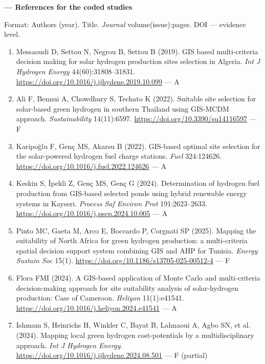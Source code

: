 \documentclass[11pt,a4paper]{article}
\begin{document}
\textbf{--- References for the coded studies}

Format: Authors (year). Title. \textit{Journal} volume(issue):pages. DOI --- evidence level.

\begin{enumerate}\setlength\itemsep{1pt}

  \item Messaoudi D, Settou N, Negrou B, Settou B (2019). GIS based multi-criteria decision making for solar hydrogen production sites selection in Algeria. \textit{Int J Hydrogen Energy} 44(60):31808--31831. \url{https://doi.org/10.1016/j.ijhydene.2019.10.099} --- A

  \item Ali F, Bennui A, Chowdhury S, Techato K (2022). Suitable site selection for solar-based green hydrogen in southern Thailand using GIS-MCDM approach. \textit{Sustainability} 14(11):6597. \url{https://doi.org/10.3390/su14116597} --- F

  \item Karipoğlu F, Genç MS, Akarsu B (2022). GIS-based optimal site selection for the solar-powered hydrogen fuel charge stations. \textit{Fuel} 324:124626. \url{https://doi.org/10.1016/j.fuel.2022.124626} --- A

  \item Keskin S, İpekli Z, Genç MS, Genç G (2024). Determination of hydrogen fuel production from GIS-based selected ponds using hybrid renewable energy systems in Kayseri. \textit{Process Saf Environ Prot} 191:2623--2633. \url{https://doi.org/10.1016/j.psep.2024.10.005} --- A

  \item Pinto MC, Gaeta M, Arco E, Boccardo P, Corgnati SP (2025). Mapping the suitability of North Africa for green hydrogen production: a multi-criteria spatial decision support system combining GIS and AHP for Tunisia. \textit{Energy Sustain Soc} 15(1). \url{https://doi.org/10.1186/s13705-025-00512-4} --- F

  \item Flora FMI (2024). A GIS-based application of Monte Carlo and multi-criteria decision-making approach for site suitability analysis of solar-hydrogen production: Case of Cameroon. \textit{Heliyon} 11(1):e41541. \url{https://doi.org/10.1016/j.heliyon.2024.e41541} --- A

  \item Ishmam S, Heinrichs H, Winkler C, Bayat B, Lahnaoui A, Agbo SN, et al. (2024). Mapping local green hydrogen cost-potentials by a multidisciplinary approach. \textit{Int J Hydrogen Energy}. \url{https://doi.org/10.1016/j.ijhydene.2024.08.501} --- F (partial)


\end{enumerate}
\end{document}
